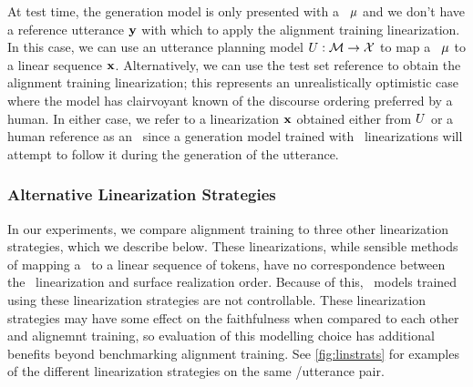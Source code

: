 At test time, the generation model is only
presented with a \meaningrepresentation~$\mu$ and we don't have a reference 
utterance $\mathbf{y}$ with which to apply the alignment training 
linearization. In this case,
we can use an utterance planning model $U : \mathcal{M} \rightarrow \mathcal{X}$ to map a \meaningrepresentation~$\mu$ to a
linear sequence $\mathbf{x}$. Alternatively, we can use the test set reference
to obtain the alignment training linearization; this represents an unrealistically
optimistic case where the model has clairvoyant known of the discourse
ordering preferred by a human.
%
In either case, we refer to 
a linearization $\mathbf{x}$ obtained either from $U$ or a human reference
as an \utteranceplan~since a generation model trained with
\alignmenttraining~linearizations will attempt to follow it during 
the generation of the utterance.



\subsubsection{Alternative Linearization Strategies}

In our experiments, we compare alignment training to three other 
linearization strategies, which we describe below. 
These linearizations, while sensible methods of mapping a 
\meaningrepresentation~to a linear sequence of tokens, have no 
correspondence between the
\meaningrepresentation~linearization and surface realization order. Because
of this, \sequencetosequence~models trained using these linearization strategies are not controllable. These linearization strategies may have some effect on the faithfulness when
compared to each other and alignemnt training, so evaluation of this modelling choice has
additional benefits beyond benchmarking alignment training.
See \autoref{fig:linstrats} for examples of the
different linearization strategies on the same \meaningrepresentation/utterance
pair.



